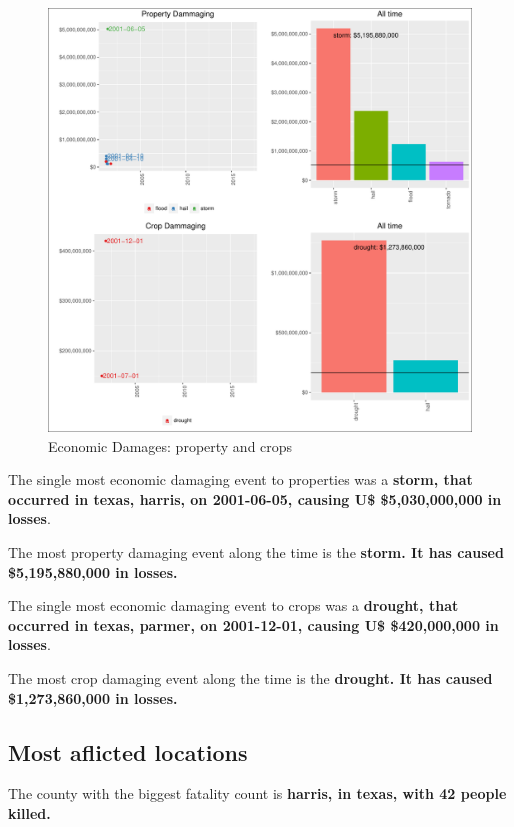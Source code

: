\documentclass[]{article}
\begin{document}
\begin{figure}[htbp]
\centering
\includegraphics{readme_files/figure-latex/economic-plot-1.pdf}
\caption{Economic Damages: property and crops}
\end{figure}

The single most economic damaging event to properties was a
\textbf{storm, that occurred in texas, harris, on 2001-06-05, causing
U\$ \$5,030,000,000 in losses}.

The most property damaging event along the time is the \textbf{storm. It
has caused \$5,195,880,000 in losses.}

The single most economic damaging event to crops was a \textbf{drought,
that occurred in texas, parmer, on 2001-12-01, causing U\$ \$420,000,000
in losses}.

The most crop damaging event along the time is the \textbf{drought. It
has caused \$1,273,860,000 in losses.}

\subsection{Most aflicted locations}\label{most-aflicted-locations-1}

The county with the biggest fatality count is \textbf{harris, in texas,
with 42 people killed.}
\end{document}
